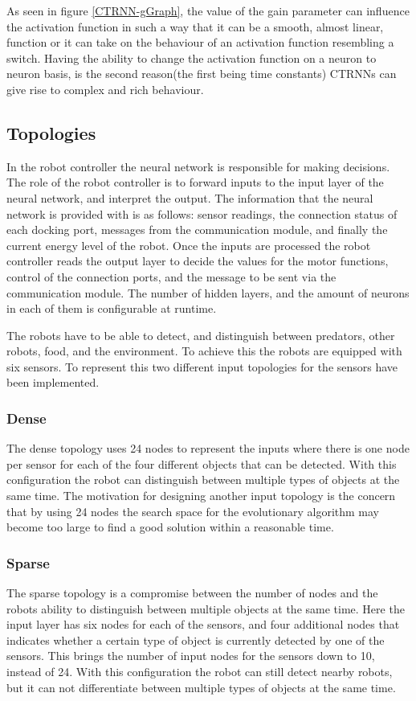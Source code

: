 As seen in figure \ref{CTRNN-gGraph}, the value of the gain parameter can influence the activation function in such a way that it can be a smooth, almost linear, function or it can take on the behaviour of an activation function resembling a switch.
Having the ability to change the activation function on a neuron to neuron basis, is the second reason(the first being time constants) CTRNNs can give rise to complex and rich behaviour.




\subsection{Topologies}
In the robot controller the neural network is responsible for making decisions.
The role of the robot controller is to forward inputs to the input layer of the neural network, and interpret the output.
The information that the neural network is provided with is as follows: sensor readings, the connection status of each docking port, messages from the communication module, and finally the current energy level of the robot.
Once the inputs are processed the robot controller reads the output layer to decide the values for the motor functions, control of the connection ports, and the message to be sent via the communication module.
The number of hidden layers, and the amount of neurons in each of them is configurable at runtime.
	
The robots have to be able to detect, and distinguish between predators, other robots, food, and the environment.
To achieve this the robots are equipped with six sensors.
To represent this two different input topologies for the sensors have been implemented.

\subsubsection{Dense}
The dense topology uses 24 nodes to represent the inputs where there is one node per sensor for each of the four different objects that can be detected.
With this configuration the robot can distinguish between multiple types of objects at the same time.
The motivation for designing another input topology is the concern that by using 24 nodes the search space for the evolutionary algorithm may become too large to find a good solution within a reasonable time.
\subsubsection{Sparse}
The sparse topology is a compromise between the number of nodes and the robots ability to distinguish between multiple objects at the same time.
Here the input layer has six nodes for each of the sensors, and four additional nodes that indicates whether a certain type of object is currently detected by one of the sensors.
This brings the number of input nodes for the sensors down to 10, instead of 24.
With this configuration the robot can still detect nearby robots, but it can not differentiate between multiple types of objects at the same time.
			
